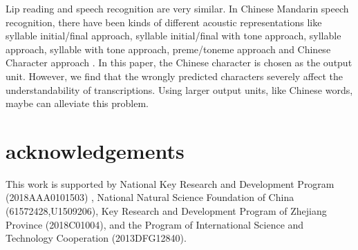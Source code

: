 \documentclass[sigconf]{acmart}
\begin{document}
Lip reading and speech recognition are very similar. In Chinese Mandarin speech recognition, there have been kinds of different acoustic representations like syllable initial/final approach, syllable initial/final with tone approach, syllable approach, syllable with tone approach, preme/toneme approach \cite{chen1997new} and Chinese Character approach \cite{zhou2018a}. In this paper, the Chinese character is chosen as the output unit. However, we find that the wrongly predicted characters severely affect the understandability of transcriptions. Using larger output units, like Chinese words, maybe can alleviate this problem. 

\section{acknowledgements}
This work is supported by  National Key Research and Development Program (2018AAA0101503) , National Natural Science Foundation of China (61572428,U1509206),  Key Research and Development Program of Zhejiang Province (2018C01004), and the Program of International Science and Technology Cooperation (2013DFG12840).

\newpage


\end{document}

